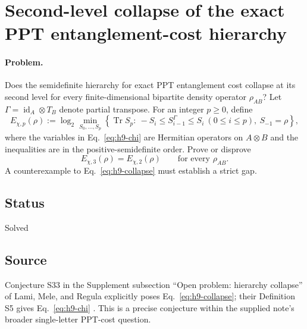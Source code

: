 \section{Second-level collapse of the exact PPT entanglement-cost hierarchy}
\label{sec:op_2e43f525333b67c0}

\paragraph{Problem.}
Does the semidefinite hierarchy for exact PPT entanglement cost collapse at its second level for every finite-dimensional bipartite density operator $\rho_{AB}$? Let $\Gamma=\operatorname{id}_A\otimes T_B$ denote partial transpose. For an integer $p\geq0$, define
\begin{equation}
 E_{\chi,p}(\rho):=\log_2\min_{S_0,\ldots,S_p}\left\{\operatorname{Tr}S_p:\ -S_i\leq S_{i-1}^{\Gamma}\leq S_i\ (0\leq i\leq p),\ S_{-1}=\rho\right\},
 \label{eq:h9-chi}
\end{equation}
where the variables in Eq.~\eqref{eq:h9-chi} are Hermitian operators on $A\otimes B$ and the inequalities are in the positive-semidefinite order. Prove or disprove
\begin{equation}
 E_{\chi,3}(\rho)=E_{\chi,2}(\rho)\qquad\text{for every }\rho_{AB}.
 \label{eq:h9-collapse}
\end{equation}
A counterexample to Eq.~\eqref{eq:h9-collapse} must establish a strict gap.

\subsection*{Status}

Solved

\subsection*{Source}

Conjecture S33 in the Supplement subsection ``Open problem: hierarchy collapse'' of Lami, Mele, and Regula explicitly poses Eq.~\eqref{eq:h9-collapse}; their Definition S5 gives Eq.~\eqref{eq:h9-chi} . This is a precise conjecture within the supplied note's broader single-letter PPT-cost question.

